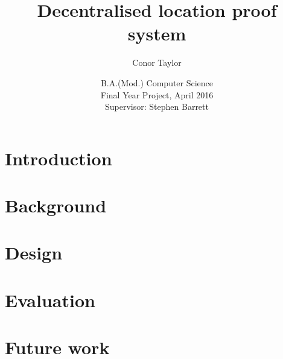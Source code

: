 \documentclass[12pt]{report}
\title{Decentralised location proof system}
\author{Conor Taylor}
\date{
	B.A.(Mod.) Computer Science\\
	Final Year Project, April 2016\\
	Supervisor: Stephen Barrett
}
\begin{document}
\maketitle

\tableofcontents
\newpage

\listoffigures
\newpage

\chapter{Introduction} \label{ch:introduction}


\chapter{Background} \label{ch:background}


\chapter{Design} \label{ch:design}


\chapter{Evaluation} \label{ch:evaluation}


\chapter{Future work} \label{ch:future_work}
\end{document}
